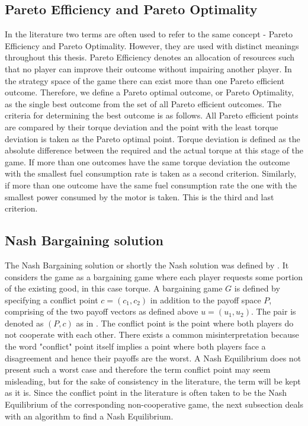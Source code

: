 \subsection{Pareto Efficiency and Pareto Optimality}
In the literature two terms are often used to refer to the same concept - Pareto Efficiency and Pareto Optimality. However, they are used with distinct meanings throughout this thesis. Pareto Efficiency denotes an allocation of resources such that no player can improve their outcome without impairing another player. In the strategy space of the game there can exist more than one Pareto efficient outcome. Therefore, we define a Pareto optimal outcome, or Pareto Optimality, as the single best outcome from the set of all Pareto efficient outcomes. The criteria for determining the best outcome is as follows. All Pareto efficient points are compared by their torque deviation and the point with the least torque deviation is taken as the Pareto optimal point. Torque deviation is defined as the absolute difference between the required and the actual torque at this stage of the game. If more than one outcomes have the same torque deviation the outcome with the smallest fuel consumption rate is taken as a second criterion. Similarly, if more than one outcome have the same fuel consumption rate the one with the smallest power consumed by the motor is taken. This is the third and last criterion.

\subsection{Nash Bargaining solution}
The Nash Bargaining solution or shortly the Nash solution was defined by \citet{nash1950bargaining}. It considers the game as a bargaining game where each player requests some portion of the existing good, in this case torque. A bargaining game $G$ is defined by specifying a conflict point $c = (c_1,c_2)$ in addition to the payoff space $P$, comprising of the two payoff vectors as defined above $u = (u_1,u_2)$. The pair is denoted as $(P,c)$ as in \citet{holler2006einfuhrung}. The conflict point is the point where both players do not cooperate with each other. There exists a common misinterpretation because the word "conflict" point itself implies a point where both players face a disagreement and hence their payoffs are the worst. A Nash Equilibrium does not present such a worst case and therefore the term conflict point may seem misleading, but for the sake of consistency in the literature, the term will be kept as it is. Since the conflict point in the literature is often taken to be the Nash Equilibrium of the corresponding non-cooperative game, the next subsection deals with an algorithm to find a Nash Equilibrium.

